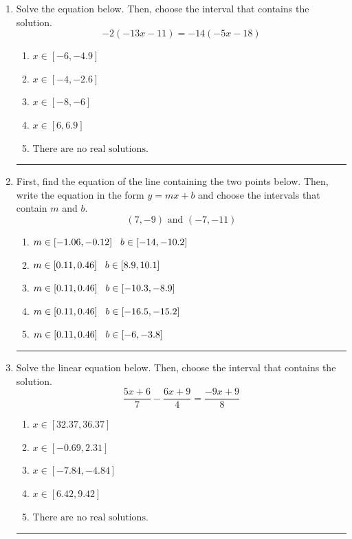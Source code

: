 \documentclass[14pt]{extbook}
\newcommand{\litem}[1]{\item#1\hspace*{-1cm}\rule{\textwidth}{0.4pt}}
\begin{document}
\begin{enumerate}
{\begin{enumerate}[label=\Alph*.]
\end{enumerate} }
\litem{
Solve the equation below. Then, choose the interval that contains the solution.\[ -2(-13x -11) = -14(-5x -18) \]\begin{enumerate}[label=\Alph*.]
\item \( x \in [-6, -4.9] \)
\item \( x \in [-4, -2.6] \)
\item \( x \in [-8, -6] \)
\item \( x \in [6, 6.9] \)
\item \( \text{There are no real solutions.} \)

\end{enumerate} }
\litem{
First, find the equation of the line containing the two points below. Then, write the equation in the form $ y=mx+b $ and choose the intervals that contain $m$ and $b$.\[ (7, -9) \text{ and } (-7, -11) \]\begin{enumerate}[label=\Alph*.]
\item \( m \in [-1.06, -0.12] \hspace*{3mm} b \in [-14, -10.2] \)
\item \( m \in [0.11, 0.46] \hspace*{3mm} b \in [8.9, 10.1] \)
\item \( m \in [0.11, 0.46] \hspace*{3mm} b \in [-10.3, -8.9] \)
\item \( m \in [0.11, 0.46] \hspace*{3mm} b \in [-16.5, -15.2] \)
\item \( m \in [0.11, 0.46] \hspace*{3mm} b \in [-6, -3.8] \)

\end{enumerate} }
\litem{
Solve the linear equation below. Then, choose the interval that contains the solution.\[ \frac{5x + 6}{7} - \frac{6x + 9}{4} = \frac{-9x + 9}{8} \]\begin{enumerate}[label=\Alph*.]
\item \( x \in [32.37, 36.37] \)
\item \( x \in [-0.69, 2.31] \)
\item \( x \in [-7.84, -4.84] \)
\item \( x \in [6.42, 9.42] \)
\item \( \text{There are no real solutions.} \)


\end{enumerate}}
\end{enumerate}
\end{document}
